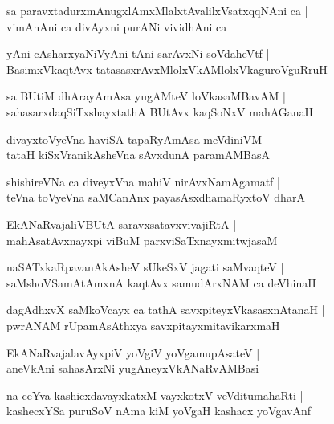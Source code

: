 \begin{shloka}
sa paravxtadurxmAnugxlAmxMlalxtAvalilxVsatxqqNAni ca |\\
vimAnAni ca divAyxni purANi vividhAni ca 
\end{shloka}

\begin{shloka}
yAni cAsharxyaNiVyAni tAni sarAvxNi soVdaheVtf |\\
BasimxVkaqtAvx tatasasxrAvxMlolxVkAMlolxVkaguroVguRruH 
\end{shloka}

\begin{shloka}
sa BUtiM dhArayAmAsa yugAMteV loVkasaMBavAM |\\
sahasarxdaqSiTxshayxtathA BUtAvx kaqSoNxV mahAGanaH 
\end{shloka}

\begin{shloka}
divayxtoVyeVna haviSA tapaRyAmAsa meVdiniVM |\\
tataH kiSxVranikAsheVna sAvxdunA paramAMBasA
\end{shloka}

\begin{shloka}
shishireVNa ca diveyxVna mahiV nirAvxNamAgamatf |\\
teVna toVyeVna saMCanAnx payasAsxdhamaRyxtoV dharA
\end{shloka}

\begin{shloka}
EkANaRvajaliVBUtA saravxsatavxvivajiRtA |\\
mahAsatAvxnayxpi viBuM parxviSaTxnayxmitwjasaM 
\end{shloka}

\begin{shloka}
naSATxkaRpavanAkAsheV sUkeSxV jagati saMvaqteV |\\
saMshoVSamAtAmxnA kaqtAvx samudArxNAM ca deVhinaH 
\end{shloka}

\begin{shloka}
dagAdhxvX saMkoVcayx ca tathA savxpiteyxVkasasxnAtanaH |\\
pwrANAM rUpamAsAthxya savxpitayxmitavikarxmaH 
\end{shloka}

\begin{shloka}
EkANaRvajalavAyxpiV yoVgiV yoVgamupAsateV |\\
aneVkAni sahasArxNi yugAneyxVkANaRvAMBasi 
\end{shloka}

\begin{shloka}
na ceYva kashicxdavayxkatxM vayxkotxV veVditumahaRti |\\
kashecxYSa puruSoV nAma kiM yoVgaH kashacx yoVgavAnf 
\end{shloka}

